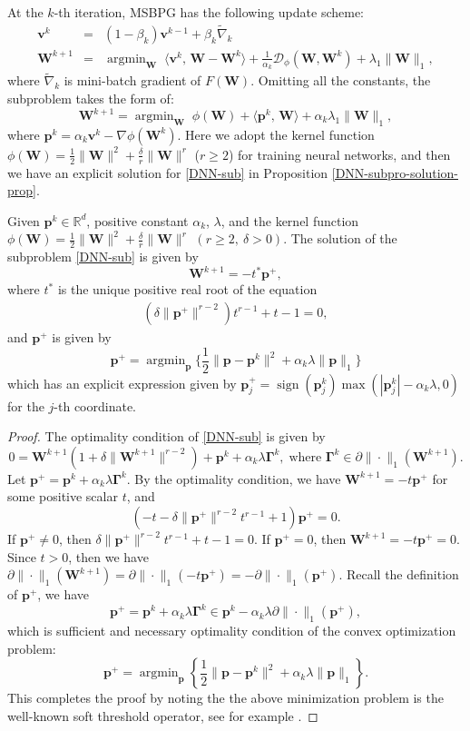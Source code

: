 \documentclass[twoside,11pt]{article}
\newcommand{\be}{\begin{equation}}
\newcommand{\ee}{\end{equation}}
\newcommand{\R}{\mathbb R}
\newcommand{\cD}{\mathcal D}
\DeclareMathOperator*{\argmin}{argmin}
\def\inprod#1#2{\langle#1,\,#2\rangle}
\def\vp{{\bm{p}}}
\def\vv{{\bm{v}}}
\def\mW{{\bm{W}}}
\begin{document}
At the $k$-th iteration, MSBPG has the following update scheme:
\begin{eqnarray}
       {\vv^{k}} &=& (1-\beta_k)\vv^{k-1}+\beta_k\widetilde\nabla_k
       \\[5pt]
    {\mW}^{k+1} &=& \argmin_{\mW}\;\inprod{\vv^k}{{\mW}-{\mW}^k}+\frac{1}{\alpha_k}\cD_\phi({\mW},{\mW}^k)+\lambda_1\|\mW\|_1,
    \label{DNN-sub-ori}
\end{eqnarray}
where $\widetilde\nabla_k$ is mini-batch gradient of $F(\mW)$. Omitting all the constants, the subproblem takes the form of:
\be 
{\mW}^{k+1}=\argmin_{\mW}\;\phi({\mW})+\inprod{\vp^k}{{\mW}}+\alpha_k\lambda_1\|{\mW}\|_1,
\label{DNN-sub}
\ee
where $\vp^k=\alpha_k\vv^k-\nabla\phi({\mW}^k)$. Here we adopt the kernel function $\phi({\mW})=\frac{1}{2}\|{\mW}\|^2+\frac{\delta}{r}\|{\mW}\|^{r}$ ($r \ge 2$) for training neural networks, and
then we have an explicit solution for \eqref{DNN-sub} in Proposition \ref{DNN-subpro-solution-prop}. %
\begin{proposition}
Given $\vp^k \in \R^d$, positive constant $\alpha_k$, $\lambda$, and the kernel function $\phi({\mW})=\frac{1}{2}\|{\mW}\|^2+\frac{\delta}{r}\|{\mW}\|^{r}$ $(r \geq 2,\ \delta>0)$. The solution of the subproblem \eqref{DNN-sub} is given by 
\[
{\mW}^{k+1}=-t^*\vp^+,
\]
where $t^*$ is the unique positive real root of the equation
\begin{eqnarray}
(\delta\|\vp^+\|^{r-2})t^{r-1}+t-1=0,
\label{eq-t*}
\end{eqnarray}
and $\vp^+$ is given by 
\[
\vp^+ = \argmin_\vp\Big\{\frac{1}{2}\|\vp-\vp^k\|^2+\alpha_k\lambda\|\vp\|_1\Big\}
\]
which has an explicit expression given by $\vp_j^+ = \operatorname{sign}(\vp_j^k) \max(|\vp_j^k|-\alpha_k\lambda,0)$ for 
the $j$-th coordinate.
\label{DNN-subpro-solution-prop}
\end{proposition}
\begin{proof}
The optimality condition of \eqref{DNN-sub} is given by 
\[
0=\mW^{k+1}(1+\delta\|\mW^{k+1}\|^{r-2})+\vp^k+\alpha_k\lambda{\bm\Gamma}^k,\;\text{where }{\bm\Gamma}^k\in\partial\|\cdot\|_1(\mW^{k+1}).
\]
Let $\vp^+=\vp^k+\alpha_k\lambda{\bm\Gamma}^k$. By the optimality condition, we have $\mW^{k+1}=-t\vp^+$ for some positive scalar $t$, and 
\[
(-t-\delta\|\vp^+\|^{r-2}t^{r-1}+1)\vp^+=0.
\]
If $\vp^+\neq0$, then $\delta\|\vp^+\|^{r-2}t^{r-1}+t-1=0$. If $\vp^+=0$, then $\mW^{k+1}=-t\vp^+=0$. Since $t>0$, then we have $\partial\|\cdot\|_1(\mW^{k+1})=\partial\|\cdot\|_1(-t\vp^+)=-\partial\|\cdot\|_1(\vp^+)$. Recall the definition of $\vp^+$, we have 
\[
\vp^+=\vp^k+\alpha_k\lambda{\bm\Gamma}^k\in\vp^k-\alpha_k\lambda\partial\|\cdot\|_1(\vp^+),
\]
which is sufficient and necessary 
optimality condition of the convex optimization problem:
\[
\vp^+ = \argmin_\vp\left\{\frac{1}{2}\|\vp-\vp^k\|^2+\alpha_k\lambda\|\vp\|_1\right\}.
\]
This completes the proof by noting the the above minimization problem is the well-known soft threshold operator, see for example \citep{friedman2010regularization}. 
\end{proof}
\end{document}
